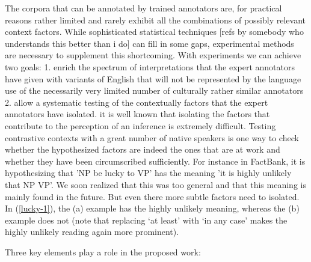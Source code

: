 \documentclass[10pt]{article}
\begin{document}
The corpora that can be annotated by trained annotators are, for practical reasons rather limited and rarely exhibit all the combinations of possibly relevant context factors. While sophisticated statistical techniques [refs by somebody who understands this better than i do] can fill in some gaps, experimental methods are necessary to supplement this shortcoming. With experiments we can achieve two goals: 
1. enrich the spectrum of interpretations that the expert annotators have given with variants of English that will not be represented by the language use of the necessarily very limited number of culturally rather similar annotators
2. allow a systematic testing of the contextually factors that the expert annotators have isolated. it is well known that isolating the factors that contribute to the perception of an inference is extremely difficult. Testing contrastive contexts with a great number of native speakers is one way to check whether the hypothesized factors are indeed the ones that are at work and whether they have been circumscribed sufficiently. For instance in FactBank, it is hypothesizing that 'NP be lucky to VP' has the meaning 'it is highly unlikely that NP VP'. We soon realized that this was too general and that this meaning is mainly found in the future. But even there more subtle factors need to isolated. In (\ref{lucky-1}), the (a) example has the highly unlikely meaning, whereas the (b) example does not (note that replacing `at least' with `in any case' makes the highly unlikely reading again more prominent).



Three key elements  play a role in the proposed work:
\end{document}
